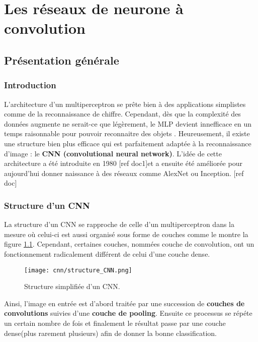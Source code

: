 
\chapter{Les réseaux de neurone à convolution}


\section{Présentation générale}

\subsection{Introduction}
L'architecture d'un multiperceptron se prête bien à des applications simplistes comme de la reconnaissance de chiffre. Cependant, dès que la complexité des données augmente ne serait-ce que légèrement, le MLP devient innefficace en un temps raisonnable pour pouvoir reconnaitre des objets . Heureusement, il existe une structure bien plus efficace qui est parfaitement adaptée à la reconnaissance d'image : le \textbf{CNN (convolutional neural network)}. L'idée de cette architecture a été introduite en 1980 [ref doc1]et a ensuite été améliorée pour aujourd'hui donner naissance à des réseaux comme AlexNet ou Inception. [ref doc]

\subsection{Structure d'un CNN}
La structure d'un CNN se rapproche de celle d'un multiperceptron dans la mesure où celui-ci est aussi organisé sous forme de couches comme le montre la figure \ref{structure_1}. Cependant, certaines couches, nommées couche de convolution, ont un fonctionnement radicalement différent de celui d'une couche dense. \\

\begin{figure}[!h]
\centering
\texttt{[image: cnn/structure\_CNN.png]} 
\caption{Structure simplifiée d'un CNN.}
\label{structure_1}
\end{figure}

Ainsi, l'image en entrée est d'abord traitée par une succession de \textbf{couches de convolutions} suivies d'une \textbf{couche de pooling}. Ensuite ce processus se répéte un certain nombre de fois et finalement le résultat passe par une couche dense(plus rarement plusieurs) afin de donner la bonne classification.

